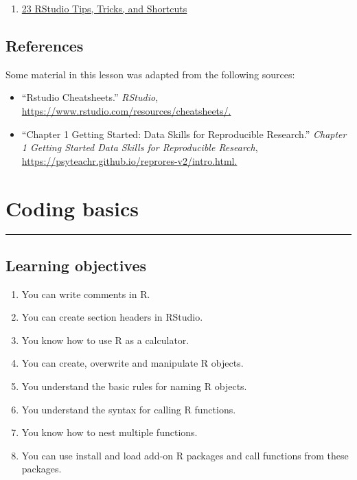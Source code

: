 \documentclass[
  letterpaper,
  DIV=11,
  numbers=noendperiod]{scrreprt}
\providecommand{\tightlist}{%
  \setlength{\itemsep}{0pt}\setlength{\parskip}{0pt}}\usepackage{longtable,booktabs,array}
\begin{document}
\begin{enumerate}
\def\labelenumi{\arabic{enumi}.}
\tightlist
\item
  \href{https://www.dataquest.io/blog/rstudio-tips-tricks-shortcuts/}{23
  RStudio Tips, Tricks, and Shortcuts}
\end{enumerate}

\hypertarget{references-2}{%
\section{References}\label{references-2}}

Some material in this lesson was adapted from the following sources:

\begin{itemize}
\tightlist
\item
  ``Rstudio Cheatsheets.'' \emph{RStudio},
  \url{https://www.rstudio.com/resources/cheatsheets/.}
\item
  ``Chapter 1 Getting Started: Data Skills for Reproducible Research.''
  \emph{Chapter 1 Getting Started \textbar{} Data Skills for
  Reproducible Research},
  \url{https://psyteachr.github.io/reprores-v2/intro.html.}
\end{itemize}


\hypertarget{coding-basics}{%
\chapter{Coding basics}\label{coding-basics}}

\begin{center}\rule{0.5\linewidth}{0.5pt}\end{center}

\hypertarget{learning-objectives-1}{%
\section*{Learning objectives}\label{learning-objectives-1}}


\begin{enumerate}
\def\labelenumi{\arabic{enumi}.}
\item
  You can write comments in R.
\item
  You can create section headers in RStudio.
\item
  You know how to use R as a calculator.
\item
  You can create, overwrite and manipulate R objects.
\item
  You understand the basic rules for naming R objects.
\item
  You understand the syntax for calling R functions.
\item
  You know how to nest multiple functions.
\item
  You can use install and load add-on R packages and call functions from
  these packages.
\end{enumerate}
\end{document}
